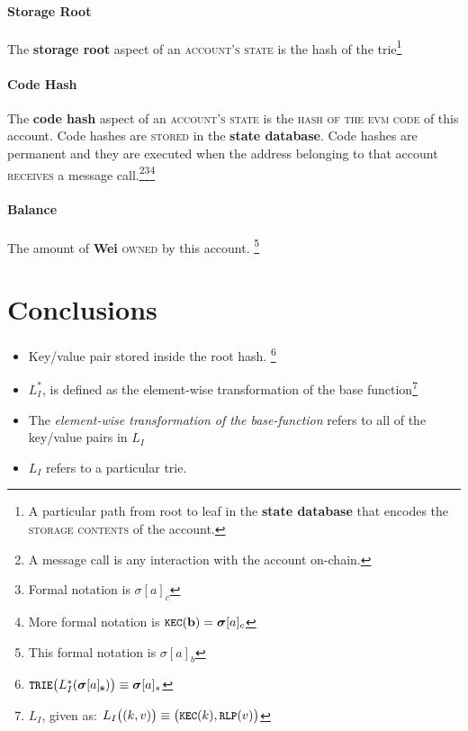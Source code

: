 \documentclass[11pt,a4paper,leqno,bibliography=totoc]{scrartcl}
\newenvironment{alphafootnotes}
{\par\edef\savedfootnotenumber{\number\value{footnote}}
\renewcommand{\thefootnote}{\alph{footnote}}
\setcounter{footnote}{0}}
{\par\setcounter{footnote}{\savedfootnotenumber}}
\begin{document}
\begin{alphafootnotes}
\begin{multicols*}{2}
    		\subsection{Storage Root}
    		The \textbf{storage root} aspect of an \textsc{account's state} is the hash of the trie\footnote{A particular path from root to leaf in the \textbf{\gls{state database}} that encodes the \textsc{storage contents} of the account.}
    		\subsection{Code Hash}
    		The \textbf{code hash} aspect of an \textsc{account's state} is the \textsc{hash of the evm code} of this account. Code hashes are \textsc{stored} in the \textbf{\gls{state database}}. Code hashes are permanent and they are executed when the address belonging to that account \textsc{receives} a message call.\footnote{A message call is any interaction with the account on-chain.}\footnote{Formal notation is $\sigma[a]_c$}\footnote{More formal notation is $\texttt{\small KEC}(\mathbf{b}) = \boldsymbol{\sigma}[a]_c$}
    		\subsection{Balance}
    		The amount of \textbf{Wei} \textsc{owned} by this account. \footnote{This formal notation is $\sigma[a]_b$}


\part{Conclusions}


    \begin{itemize}

    	\item Key/value pair stored inside the root hash. \footnote{$\texttt{\small TRIE}\big(L_I^*(\boldsymbol{\sigma}[a]_\mathbf{s})\big) \equiv \boldsymbol{\sigma}[a]_s$}


    		\item $L_I^*$, is defined as the element-wise transformation of the base function\footnote{$L_I$, given as: $L_I\big( (k, v) \big) \equiv \big(\texttt{\small KEC}(k), \texttt{\small RLP}(v)\big)$}
    			\item The \textsl{element-wise transformation of the base-function} refers to all of the key/value pairs in \textit{$L_I$}
    				\item $L_I$ refers to a particular \gls{trie}.



\end{itemize}
\end{multicols*}
\end{alphafootnotes}
\end{document}
